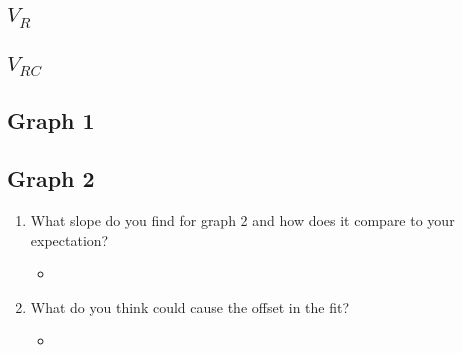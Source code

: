 \documentclass{article}
\begin{document}
\begin{center}
  \subsection*{\(V_R\)}
  \subsection*{\(V_{RC}\)}
\end{center}

\newpage
\begin{center}
  \subsection*{Graph 1}
  \subsection*{Graph 2}
\end{center}

\begin{center}
  \begin{enumerate}
    \item What slope do you find for graph 2 and how does it compare to your expectation?
    \begin{itemize}
      \item
    \end{itemize}
    \item What do you think could cause the offset in the fit?
    \begin{itemize}
      \item
    \end{itemize}
  \end{enumerate}
\end{center}
\end{document}
